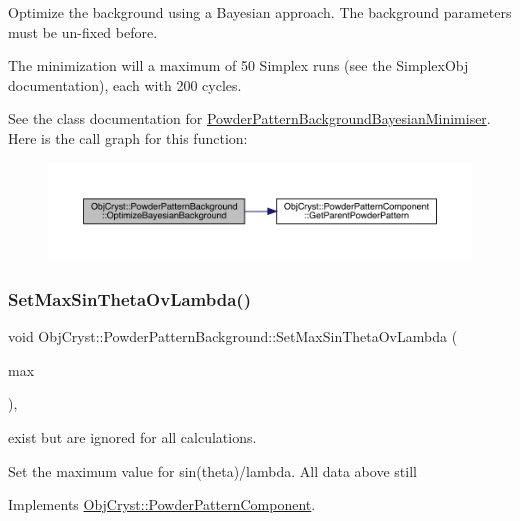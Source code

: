 Optimize the background using a Bayesian approach. The background parameters must be un-\/fixed before.

The minimization will a maximum of 50 Simplex runs (see the Simplex\+Obj documentation), each with 200 cycles.

See the class documentation for \mbox{\hyperlink{class_obj_cryst_1_1_powder_pattern_background_bayesian_minimiser}{Powder\+Pattern\+Background\+Bayesian\+Minimiser}}. Here is the call graph for this function\+:
\nopagebreak
\begin{figure}[H]
\begin{center}
\leavevmode
\includegraphics[width=350pt]{class_obj_cryst_1_1_powder_pattern_background_a0735ae2350ebce9320ebc2fd16dd94be_cgraph}
\end{center}
\end{figure}
\mbox{\label{class_obj_cryst_1_1_powder_pattern_background_a3d1c345df8269ff883bd3b6f82b57d57}} 
\subsubsection{\texorpdfstring{SetMaxSinThetaOvLambda()}{SetMaxSinThetaOvLambda()}}
{\footnotesize\ttfamily void Obj\+Cryst\+::\+Powder\+Pattern\+Background\+::\+Set\+Max\+Sin\+Theta\+Ov\+Lambda (\begin{DoxyParamCaption}\item[{const R\+E\+AL}]{max }\end{DoxyParamCaption})\hspace{0.3cm}{\ttfamily [protected]}, {\ttfamily [virtual]}}



exist but are ignored for all calculations. 

Set the maximum value for sin(theta)/lambda. All data above still 

Implements \mbox{\hyperlink{class_obj_cryst_1_1_powder_pattern_component_a4731b5a64ee9aab6779e2ef323242fe5}{Obj\+Cryst\+::\+Powder\+Pattern\+Component}}.

